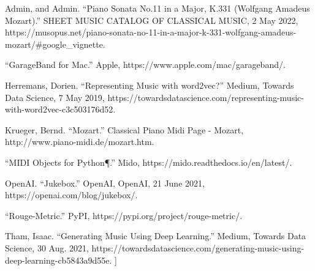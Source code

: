 \documentclass{article}
\begin{document}
\pagebreak
\begin{thebibliography}{9}
Admin, and Admin. “Piano Sonata No.11 in a Major, K.331 (Wolfgang Amadeus Mozart).” SHEET MUSIC CATALOG OF CLASSICAL MUSIC, 2 May 2022, https://musopus.net/piano-sonata-no-11-in-a-major-k-331-wolfgang-amadeus-mozart/\#google\_vignette.

“GarageBand for Mac.” Apple, https://www.apple.com/mac/garageband/.

Herremans, Dorien. “Representing Music with word2vec?” Medium, Towards Data Science, 7 May 2019, https://towardsdatascience.com/representing-music-with-word2vec-c3c503176d52.

Krueger, Bernd. “Mozart.” Classical Piano Midi Page - Mozart, http://www.piano-midi.de/mozart.htm.

“MIDI Objects for Python¶.” Mido, https://mido.readthedocs.io/en/latest/. 

OpenAI. “Jukebox.” OpenAI, OpenAI, 21 June 2021, https://openai.com/blog/jukebox/. 

“Rouge-Metric.” PyPI, https://pypi.org/project/rouge-metric/. 

Tham, Isaac. “Generating Music Using Deep Learning.” Medium, Towards Data Science, 30 Aug. 2021, https://towardsdatascience.com/generating-music-using-deep-learning-cb5843a9d55e. 
]
\end{thebibliography}
\end{document}
